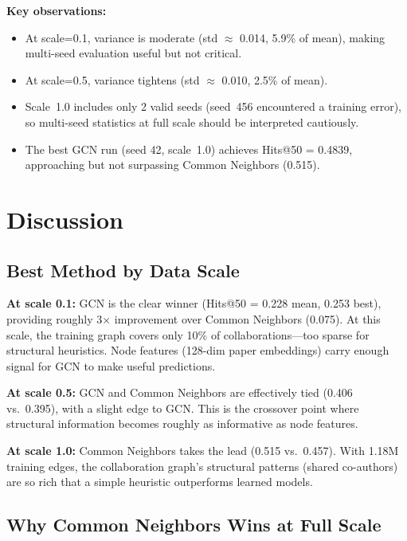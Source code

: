 \documentclass[12pt,a4paper]{article}
\begin{document}
\textbf{Key observations:}
\begin{itemize}[nosep]
    \item At scale=0.1, variance is moderate (std $\approx$ 0.014, 5.9\% of mean), making multi-seed evaluation useful but not critical.
    \item At scale=0.5, variance tightens (std $\approx$ 0.010, 2.5\% of mean).
    \item Scale~1.0 includes only 2 valid seeds (seed~456 encountered a training error), so multi-seed statistics at full scale should be interpreted cautiously.
    \item The best GCN run (seed 42, scale~1.0) achieves Hits@50 = 0.4839, approaching but not surpassing Common Neighbors (0.515).
\end{itemize}

\section{Discussion}

\subsection{Best Method by Data Scale}

\textbf{At scale 0.1:} GCN is the clear winner (Hits@50 = 0.228 mean, 0.253 best), providing roughly 3$\times$ improvement over Common Neighbors (0.075). At this scale, the training graph covers only 10\% of collaborations—too sparse for structural heuristics. Node features (128-dim paper embeddings) carry enough signal for GCN to make useful predictions.

\textbf{At scale 0.5:} GCN and Common Neighbors are effectively tied (0.406 vs.\ 0.395), with a slight edge to GCN. This is the crossover point where structural information becomes roughly as informative as node features.

\textbf{At scale 1.0:} Common Neighbors takes the lead (0.515 vs.\ 0.457). With 1.18M training edges, the collaboration graph's structural patterns (shared co-authors) are so rich that a simple heuristic outperforms learned models.

\subsection{Why Common Neighbors Wins at Full Scale}
\end{document}
